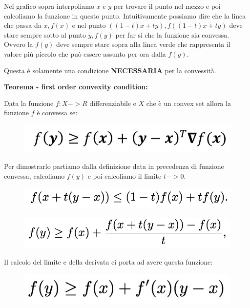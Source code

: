 \documentclass[14pt]{extreport}
\begin{document}
Nel grafico sopra interpoliamo $x$ e $y$ per trovare il punto nel mezzo e poi calcoliamo la funzione in questo punto. Intuitivamente possiamo dire che
la linea che passa da $x, f(x)$ e nel punto $((1-t)x+ty), f((1-t)x+ty)$ deve stare sempre sotto al punto $y, f(y)$ per far si che la funzione sia
convessa. Ovvero la $f(y)$ deve sempre stare sopra alla linea verde che rappresenta il valore più piccolo che può essere assunto per ora dalla $f(y)$.

Questa è solamente una condizione \textbf{NECESSARIA} per la convessità.

\textbf{Teorema - first order convexity condition:}

Data la funzione $f: X -> R$ differenziabile e $X$ che è un convex set allora la funzione $f$ è convessa se:

\begin{figure}[H]
	\centering
	\includegraphics[width=0.7\linewidth]{223.jpeg}
\end{figure}

Per dimostrarlo partiamo dalla definizione data in precedenza di funzione convessa, calcoliamo $f(y)$  e poi calcoliamo il limite $t->0$.

\begin{figure}[H]
	\centering
	\includegraphics[width=0.5\linewidth]{224.jpeg}
\end{figure}

\begin{figure}[H]
	\centering
	\includegraphics[width=0.5\linewidth]{225.jpeg}
\end{figure}


Il calcolo del limite e della derivata ci porta ad avere questa funzione:

\begin{figure}[H]
	\centering
	\includegraphics[width=0.5\linewidth]{226.jpeg}
\end{figure}
\end{document}
